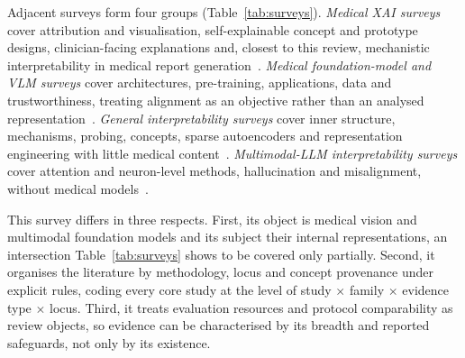 Adjacent surveys form four groups (Table~\ref{tab:surveys}). \emph{Medical XAI surveys} cover attribution
and visualisation, self-explainable concept and prototype designs, clinician-facing explanations and, closest
to this review, mechanistic interpretability in medical report
generation~\cite{tjoa2019survey,vandervelden2021explainable,salahuddin2021transparency,shrestha2023medical,hou2024self,sun2024explainable,imran2026multimodal,muhammad2025cracking}.
\emph{Medical foundation-model and VLM surveys} cover architectures, pre-training, applications, data and
trustworthiness, treating alignment as an objective rather than an analysed
representation~\cite{zhang2023challenges,azad2023foundational,khan2024comprehensive,ye2025multimodal}.
\emph{General interpretability surveys} cover inner structure, mechanisms, probing, concepts, sparse
autoencoders and representation engineering with little medical
content~\cite{rauker2022toward,bereska2024mechanistic,belinkov2021probing,poeta2023concept,shu2025a,wehner2025taxonomy,knab2026whats}.
\emph{Multimodal-LLM interpretability surveys} cover attention and neuron-level methods, hallucination and
misalignment, without medical
models~\cite{lin2025survey,dang2024explainable,shu2025large,bai2024hallucination,zhang2026locate}.

This survey differs in three respects. First, its object is medical vision and multimodal foundation models
and its subject their internal representations, an intersection Table~\ref{tab:surveys} shows to be
covered only partially. Second, it organises the literature by methodology, locus and concept provenance under explicit rules,
coding every core study at the level of study $\times$ family $\times$ evidence type $\times$ locus. Third, it treats evaluation resources and protocol comparability as review
objects, so evidence can be characterised by its breadth and reported safeguards, not only by its existence.

